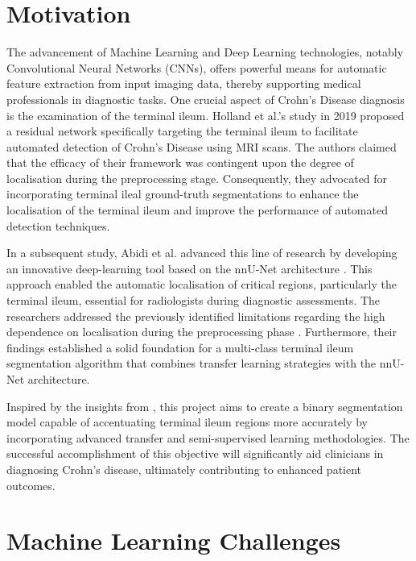 \section{Motivation}

The advancement of Machine Learning and Deep Learning technologies, notably Convolutional Neural Networks (CNNs), offers powerful means for automatic feature extraction from input imaging data, thereby supporting medical professionals in diagnostic tasks. One crucial aspect of Crohn's Disease diagnosis is the examination of the terminal ileum. Holland et al.'s study \cite{holland2019automatic} in 2019 proposed a residual network specifically targeting the terminal ileum to facilitate automated detection of Crohn's Disease using MRI scans. The authors claimed that the efficacy of their framework was contingent upon the degree of localisation during the preprocessing stage. Consequently, they advocated for incorporating terminal ileal ground-truth segmentations to enhance the localisation of the terminal ileum and improve the performance of automated detection techniques.

In a subsequent study, Abidi et al. \cite{Ali2022} advanced this line of research by developing an innovative deep-learning tool based on the nnU-Net architecture \cite{isensee2021nnu}. This approach enabled the automatic localisation of critical regions, particularly the terminal ileum, essential for radiologists during diagnostic assessments. The researchers addressed the previously identified limitations regarding the high dependence on localisation during the preprocessing phase \cite{holland2019automatic}. Furthermore, their findings established a solid foundation for a multi-class terminal ileum segmentation algorithm that combines transfer learning strategies with the nnU-Net architecture.

Inspired by the insights from \cite{holland2019automatic, Ali2022}, this project aims to create a binary segmentation model capable of accentuating terminal ileum regions more accurately by incorporating advanced transfer and semi-supervised learning methodologies. The successful accomplishment of this objective will significantly aid clinicians in diagnosing Crohn's disease, ultimately contributing to enhanced patient outcomes.

\section{Machine Learning Challenges}

